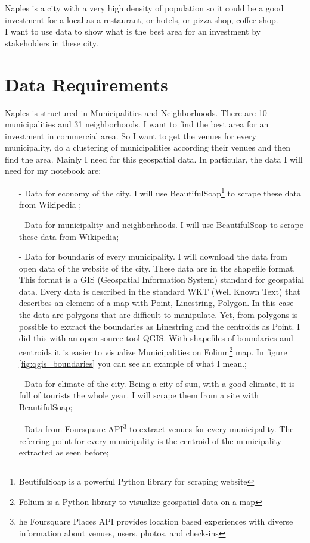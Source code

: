 \documentclass[a4paper, 12pt, oneside]{book}
\begin{document}
Naples is a city with a very high density of population so it could be a good investment for a local as a restaurant, or hotels, or pizza shop, coffee shop.\\

I want to use data to show what is the best area for an investment by stakeholders in these city.

\chapter*{Data Requirements}
\label{ch:dataRequirements}
Naples is structured in Municipalities and Neighborhoods. There are 10 municipalities and 31 neighborhoods. I want to find the best area for an investment in commercial area. So I want to get the venues for every municipality, do a clustering of municipalities according their venues and then find the area. Mainly I need for this geospatial data. In particular, the data I will need for my notebook are:\\
\begin{itemize}
\item[-] Data for economy of the city. I will use BeautifulSoap\footnote{BeutifulSoap is a powerful Python library for scraping website} to scrape these data from Wikipedia \cite{economics};

\item[-] Data for municipality and neighborhoods. I will use BeautifulSoap to scrape these data from Wikipedia\cite{municipalities};

\item[-] Data for boundaris of every municipality. I will download the data from open data of the website of the city\cite{opendata}. These data are in the shapefile format. This format is a GIS (Geospatial Information System) standard for geospatial data. Every data is described in the standard WKT (Well Known Text) that describes an element of a map with Point, Linestring, Polygon. In this case the data are polygons that are difficult to manipulate. Yet, from polygons is possible to extract the boundaries as Linestring and the centroids as Point. I did this with an open-source tool QGIS. With shapefiles of boundaries and centroids it is easier to visualize Municipalities on Folium\footnote{Folium is a Python library to visualize geospatial data on a map} map. In figure \ref{fig:qgis_boundaries} you can see an example of what I mean.;

\item[-] Data for climate of the city. Being a city of sun, with a good climate, it is full of tourists the whole year. I will scrape them from a site\cite{climate} with BeautifulSoap;

\item[-] Data from Foursquare API\footnote{he Foursquare Places API provides location based experiences with diverse information about venues, users, photos, and check-ins } to extract venues for every municipality. The referring point for every municipality is the centroid of the municipality extracted as seen before;

\end{itemize}
\end{document}
